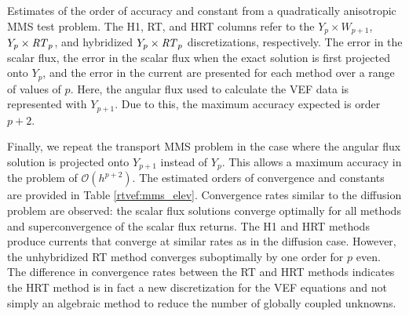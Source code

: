 \documentclass[../doc.tex]{subfiles}
\begin{document}
\begin{table}
\centering
\caption{Estimates of the order of accuracy and constant from a quadratically anisotropic MMS test problem. The H1, RT, and HRT columns refer to the $Y_p\times W_{p+1}$, $Y_p\times \mathit{RT}_p$, and hybridized $Y_p\times \mathit{RT}_p$ discretizations, respectively. The error in the scalar flux, the error in the scalar flux when the exact solution is first projected onto $Y_p$, and the error in the current are presented for each method over a range of values of $p$. Here, the angular flux used to calculate the VEF data is represented with $Y_{p+1}$. Due to this, the maximum accuracy expected is order $p+2$.}
\label{rtvef:mms_elev}

\end{table}
Finally, we repeat the transport MMS problem in the case where the angular flux solution is projected onto $Y_{p+1}$ instead of $Y_p$. This allows a maximum accuracy in the problem of $\mathcal{O}(h^{p+2})$. The estimated orders of convergence and constants are provided in Table \ref{rtvef:mms_elev}. Convergence rates similar to the diffusion problem are observed: the scalar flux solutions converge optimally for all methods and superconvergence of the scalar flux returns. The H1 and HRT methods produce currents that converge at similar rates as in the diffusion case. However, the unhybridized RT method converges suboptimally by one order for $p$ even. The difference in convergence rates between the RT and HRT methods indicates the HRT method is in fact a new discretization for the VEF equations and not simply an algebraic method to reduce the number of globally coupled unknowns. 
\end{document}

